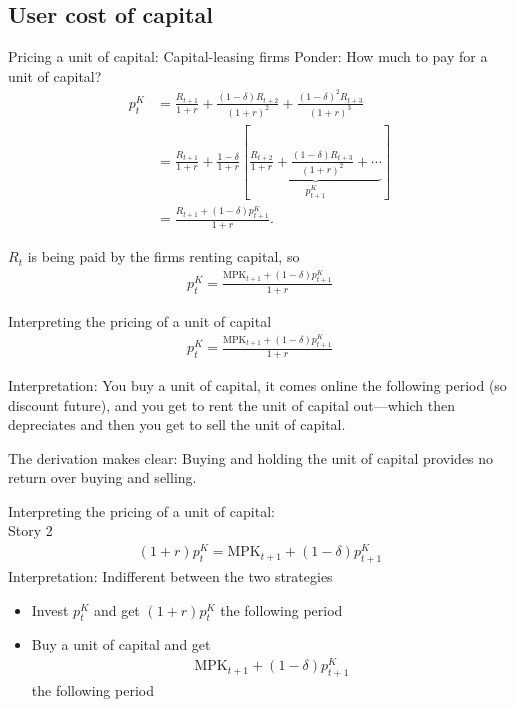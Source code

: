 \documentclass[presentation,dvipsnames]{beamer}
\begin{document}
\subsection{User cost of capital}
\begin{frame}[label=sec-2-8]{Pricing a unit of capital: Capital-leasing firms}
Ponder: How much to pay for a unit of capital?
\begin{align*}
p_{t}^{K} &= \frac{R_{t+1}}{1+r} + \frac{(1-\delta)R_{t+2}}{(1+r)^{2}} +
\frac{(1-\delta)^{2}R_{t+3}}{(1+r)^{3}} \\
&= \frac{R_{t+1}}{1+r} + \frac{1-\delta}{1+r} \left[
\underbrace{\frac{R_{t+2}}{1+r} + \frac{(1-\delta)R_{t+3}}{(1+r)^{2}} + \cdots}_{p_{t+1}^{K}}
\right] \\
&= \frac{R_{t+1} + (1-\delta)p_{t+1}^{K}}{1+r}.
\end{align*}

$R_{t}$ is being paid by the firms renting capital, so
\begin{align*}
p_{t}^{K} = \frac{\text{MPK}_{t+1} + (1-\delta)p_{t+1}^{K}}{1+r}
\end{align*}
\end{frame}

\begin{frame}[label=sec-2-9]{Interpreting the pricing of a unit of capital}
\begin{align*}
p_{t}^{K} = \frac{\text{MPK}_{t+1} + (1-\delta)p_{t+1}^{K}}{1+r}
\end{align*}

Interpretation: You buy a unit of capital,
it comes online the following period (so discount future), and
you get to rent the unit of capital out---which then depreciates and then you get to sell the unit of capital.

\vspace{1em}

The derivation makes clear: Buying and holding the unit of capital provides no return over buying and selling.
\end{frame}

\begin{frame}[label=sec-2-9]{Interpreting the pricing of a unit of capital: \\ Story 2}
\begin{align*}
(1+r)p_{t}^{K} = \text{MPK}_{t+1} + (1-\delta)p_{t+1}^{K}
\end{align*}
Interpretation: Indifferent between the two strategies
\begin{itemize}[label={--}]
\item Invest $p_{t}^{K}$ and get $(1+r)p_{t}^{K}$ the following period
\item Buy a unit of capital and get
\begin{align*}
\text{MPK}_{t+1} + (1-\delta)p_{t+1}^{K}
\end{align*}
the following period
\end{itemize}
\end{frame}
\end{document}
